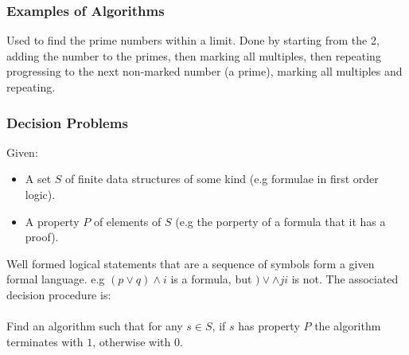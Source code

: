 \documentclass{report}
\begin{document}
\subsubsection*{Examples of Algorithms}
\begin{itemize}
	 {
		Used to find the prime numbers within a limit. Done by starting from the 2, adding the number to the primes, then marking all multiples, then repeating progressing to the next non-marked number (a prime), marking all multiples and repeating.
		
	}
\end{itemize}

\subsubsection{Decision Problems}
Given:
\begin{itemize}
	\item A set $S$ of finite data structures of some kind (e.g formulae in first order logic).
	\item A property $P$ of elements of $S$ (e.g the porperty of a formula that it has a proof).
\end{itemize}
 {Well formed logical statements that are a sequence of symbols form a given formal language. e.g $(p \lor q) \land i$ is a formula, but $) \lor \land j i$ is not.}
The associated decision procedure is:
\\
\\ Find an algorithm such that for any $s \in S$, if $s$ has property $P$ the algorithm terminates with $1$, otherwise with $0$.
\end{document}
